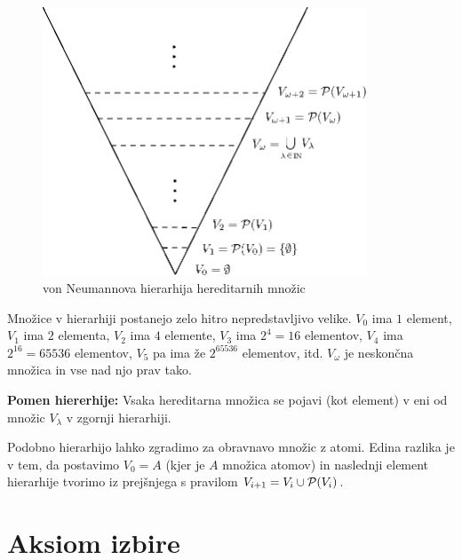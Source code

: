 \documentclass[11pt,paper=b5,footinclude,headinclude]{scrbook} %
\begin{document}
\begin{figure}[h!]
\begin{center}
\includegraphics[height=80mm]{hierarhija.eps}
\caption{von Neumannova hierarhija hereditarnih množic}
\end{center}
\end{figure}

Množice v hierarhiji postanejo zelo hitro nepredstavljivo velike.
$V_0$ ima $1$ element, $V_1$ ima $2$ elementa, $V_2$ ima $4$ elemente, $V_3$ ima $2^4 = 16$ elementov,
$V_4$ ima $2^{16} = 65536$ elementov, $V_5$ pa ima že $2^{65536}$ elementov, itd.
$V_\omega$ je neskončna množica in vse nad njo prav tako.

\textbf{ Pomen hiererhije:}
Vsaka hereditarna  množica se pojavi (kot element) v eni od množic $V_\lambda$ v zgornji hierarhiji.

Podobno hierarhijo lahko zgradimo za obravnavo množic z atomi. Edina razlika je v tem, da
postavimo $V_0 = A$ (kjer je $A$ množica atomov)
in naslednji element hierarhije tvorimo iz prejšnjega s pravilom $V_{i+1} = V_i\cup {\cal P}(V_i)$.

\newpage

\chapter{Aksiom izbire}

\end{document}
